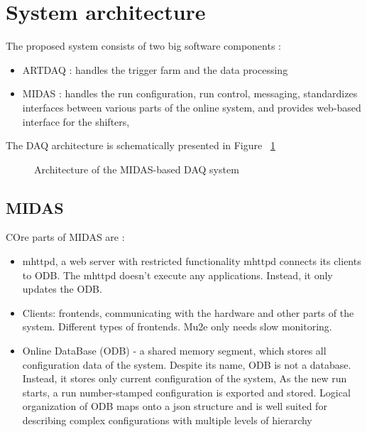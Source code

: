 \section{System architecture}

The proposed system consists of two big software components :
\begin{itemize}
\item
  ARTDAQ : handles the trigger farm and the data processing
\item
  MIDAS : handles the run configuration, run control, messaging,
  standardizes interfaces between various parts of the online system,
  and provides web-based interface for the shifters,
\end{itemize}

The DAQ architecture is schematically presented in Figure ~\ref{figure:system_architecture}
\begin{figure}[H]
  \caption{
    \label{figure:system_architecture}
    Architecture of the MIDAS-based DAQ system
  }
\end{figure}

\subsection{MIDAS}

COre parts of MIDAS are :

\begin{itemize}
\item 
  mhttpd, a web server with restricted functionality
  mhttpd connects its clients to ODB. 
  The mhttpd doesn't execute any applications. Instead, it only updates the ODB.
\item
  Clients: frontends, communicating with the hardware and other
  parts of the system. Different types of frontends. Mu2e only needs slow monitoring.
\item
  Online DataBase (ODB) - a shared memory segment, which stores all configuration data of the system. Despite its name, ODB is not a database. Instead, it stores only current configuration
  of the system, As the new run starts, a run number-stamped configuration is exported and stored.
  Logical organization of ODB maps onto a json structure and is well suited for describing
  complex configurations with multiple levels of hierarchy
\end{itemize}

